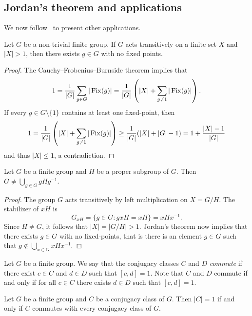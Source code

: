 \subsection{Jordan's theorem and applications}

We now follow~\cite{MR1997347} to present other applications. 

\begin{theorem}[Jordan]
    Let $G$ be a non-trivial finite group. If $G$ acts transitively 
    on a finite set $X$ and $|X|>1$, then there exists 
    $g\in G$ with no fixed points.
\end{theorem}

\begin{proof}
    The Cauchy--Frobenius--Burnside theorem implies that
    \[
    1=\frac{1}{|G|}\sum_{g\in G}|\operatorname{Fix}(g)|=\frac{1}{|G|}\left(|X|+\sum_{g\ne 1}|\operatorname{Fix}(g)|\right).
    \]
    If every $g\in G\setminus\{1\}$ contains at least one fixed-point, then
    \[
    1=\frac{1}{|G|}\left(|X|+\sum_{g\ne 1}|\operatorname{Fix}(g)|\right)\geq \frac{1}{|G|}(|X|+|G|-1)=1+\frac{|X|-1}{|G|}
    \]
    and thus $|X|\leq1$, a contradiction. 
\end{proof}

\begin{corollary}
\label{cor:Jordan}
    Let $G$ be a finite group and $H$ be a proper subgroup of $G$. 
    Then $G\ne\bigcup_{g\in G}gHg^{-1}$.
\end{corollary}

\begin{proof}
    The group $G$ acts transitively by left multiplication on $X=G/H$. The stabilizer
    of $xH$ is 
    \[
    G_{xH}=\{g\in G:gxH=xH\}=xHx^{-1}.
    \]
    Since $H\ne G$, it follows that $|X|=|G/H|>1$. Jordan's theorem now implies
    that there exists $g\in G$ with no fixed-points, that is 
    there is an element $g\in G$ such that $g\not\in\bigcup_{x\in G}xHx^{-1}$. 
\end{proof}

Let $G$ be a finite group. We say that the conjugacy classes $C$ and $D$ 
\emph{commute} if there exist 
$c\in C$ and $d\in D$ such that $[c,d]=1$. 
Note that $C$ and $D$ commute if and only if for all $c\in C$ there exists $d\in D$ 
such that $[c,d]=1$. 

\begin{corollary}[Wildon]
    Let $G$ be a finite group and $C$ be a conjugacy class of $G$. 
    Then $|C|=1$ if and only if $C$ commutes 
    with every conjugacy class of $G$.
\end{corollary}
    
